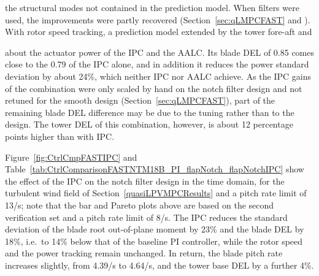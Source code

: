 
the structural modes not contained in the prediction model. When filters were used, the
improvements were partly recovered (Section~\ref{sec:qLMPCFAST} and ). With rotor speed tracking, a prediction model extended by the tower fore-aft and

about the actuator power of the IPC and the AALC. Its blade DEL of 0.85 comes close to the 0.79 of
the IPC alone, and in addition it reduces the power standard deviation by about 24\%, which
neither IPC nor AALC achieve. As the IPC gains of the combination were only scaled by hand on the
notch filter design and not retuned for the smooth design (Section~\ref{sec:qLMPCFAST}), part of
the remaining blade DEL difference may be due to the tuning rather than to the design. The tower
DEL of this combination, however, is about 12 percentage points higher than with IPC.


Figure~\ref{fig:CtrlCmpFASTIPC} and Table~\ref{tab:CtrlComparisonFASTNTM18B_PI_flapNotch_flapNotchIPC} show the effect of the IPC on the notch filter design in the time domain, for the turbulent wind field of Section~\ref{quasiLPVMPCResults} and a pitch rate limit of 13\textdegree/s; note that the bar and Pareto plots above are based on the second verification set and a pitch rate limit of 8\textdegree/s. The IPC reduces the standard deviation of the blade root out-of-plane moment by 23\% and the blade DEL by 18\%, i.e.\ to 14\% below that of the baseline PI controller, while the rotor speed and the power tracking remain unchanged. In return, the blade pitch rate increases slightly, from 4.39\textdegree/s to 4.64\textdegree/s, and the tower base DEL by a further 4\%.

